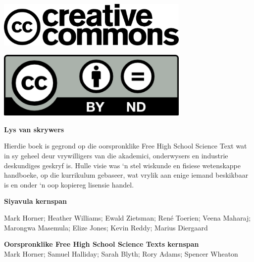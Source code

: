 \vspace*{3.8in}

\begin{center}
\begin{minipage}{0.6\textwidth}
\includegraphics[width=0.7\textwidth]{title_images/cc2.png}
\end{minipage}
\begin{minipage}{0.3\textwidth}
\includegraphics[width=0.7\textwidth]{title_images/cc1.png}
\end{minipage}
\end{center}







\newpage
\thispagestyle{empty}


\begin{flushleft} \textbf{\huge Lys van skrywers} \end{flushleft}

{\Large Hierdie boek is gegrond op die oorspronklike Free High School Science Text wat in sy geheel deur vrywilligers van die akademici, onderwysers en industrie deskundiges geskryf is. Hulle visie was ‘n stel wiskunde en fisiese wetenskappe handboeke, op die kurrikulum gebaseer, wat vrylik aan enige iemand beskikbaar is en onder ‘n oop kopiereg lisensie handel.\par } 

\textbf{\Large Siyavula kernspan} 

Mark Horner; Heather Williams; Ewald Zietsman; Ren\'{e} Toerien; Veena Maharaj; Marongwa Masemula; Elize Jones; Kevin Reddy; Marius Diergaard \par

\textbf{\Large Oorspronklike Free High School Science Texts kernspan}\\

Mark Horner; Samuel Halliday; Sarah Blyth; Rory Adams; Spencer Wheaton \par 


